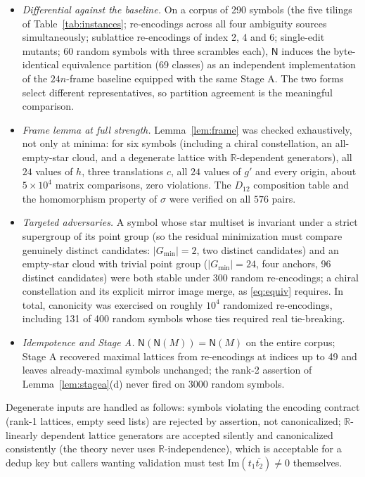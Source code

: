 \documentclass[11pt]{article}
\theoremstyle{definition}
\newcommand{\R}{\mathbb{R}}
\newcommand{\Gmin}{G_{\min}}
\newcommand{\N}{\mathsf{N}}
\begin{document}
\begin{itemize}\itemsep2pt
\item \emph{Differential against the baseline.} On a corpus of 290 symbols (the five
tilings of Table~\ref{tab:instances}; re-encodings across all four ambiguity sources
simultaneously; sublattice re-encodings of index 2, 4 and 6; single-edit mutants; 60 random
symbols with three scrambles each), $\N$ induces the byte-identical equivalence partition
(69 classes) as an independent implementation of the $24n$-frame baseline equipped with the
same Stage A. The two forms select different representatives, so partition agreement is the
meaningful comparison.
\item \emph{Frame lemma at full strength.} Lemma~\ref{lem:frame} was checked exhaustively,
not only at minima: for six symbols (including a chiral constellation, an all-empty-star
cloud, and a degenerate lattice with $\R$-dependent generators), all $24$ values of $h$,
three translations $c$, all $24$ values of $g'$ and every origin, about $5\times10^4$
matrix comparisons, zero violations. The $D_{12}$ composition table and the homomorphism
property of $\sigma$ were verified on all $576$ pairs.
\item \emph{Targeted adversaries.} A symbol whose star multiset is invariant under a strict
supergroup of its point group (so the residual minimization must compare genuinely distinct
candidates: $|\Gmin|=2$, two distinct candidates) and an empty-star cloud with trivial
point group ($|\Gmin|=24$, four anchors, 96 distinct candidates) were both stable under 300
random re-encodings; a chiral constellation and its explicit mirror image merge, as
\eqref{eq:equiv} requires. In total, canonicity was exercised on roughly $10^4$ randomized
re-encodings, including 131 of 400 random symbols whose ties required real tie-breaking.
\item \emph{Idempotence and Stage A.} $\N(\N(M))=\N(M)$ on the entire corpus; Stage A
recovered maximal lattices from re-encodings at indices up to 49 and leaves already-maximal
symbols unchanged; the rank-2 assertion of Lemma~\ref{lem:stagea}(d) never fired on 3000
random symbols.
\end{itemize}

Degenerate inputs are handled as follows: symbols violating the encoding contract (rank-1
lattices, empty seed lists) are rejected by assertion, not canonicalized;
$\R$-linearly dependent lattice generators are accepted silently and canonicalized
consistently (the theory never uses $\R$-independence), which is acceptable for a dedup key
but callers wanting validation must test $\mathrm{Im}(t_1\overline{t_2})\neq0$ themselves.
\end{document}
